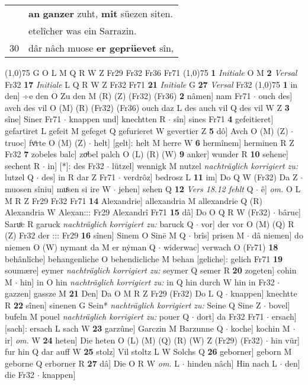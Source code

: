 \documentclass[8pt,a4paper,notitlepage]{article}
\begin{document}
\begin{table}[ht]
\begin{minipage}[t]{0.5\linewidth}
\begin{tabular}{rl}
 & \textbf{an} \textbf{ganzer} zuht, \textbf{mit} süezen siten.\\ 
 & etelîcher was ein Sarrazin.\\ 
30 & dâr nâch muose \textbf{er geprüevet} sîn,\\ 
\end{tabular}
\scriptsize
\line(1,0){75} \newline
G O L M Q R W Z Fr29 Fr32 Fr36 Fr71 \newline
\line(1,0){75} \newline
\textbf{1} \textit{Initiale} O M  \textbf{2} \textit{Versal} Fr32  \textbf{17} \textit{Initiale} L Q R W Z Fr32 Fr71  \textbf{21} \textit{Initiale} G  \textbf{27} \textit{Versal} Fr32  \newline
\line(1,0){75} \newline
\textbf{1} in den] ÷e den O Zu den M (R) (Z) (Fr32) (Fr36) \textbf{2} nâmen] nam Fr71  $\cdot$ ouch des] avch des vil O (M) (R) (Fr32) (Fr36) ouch daz L des auch vil Q des vil W Z \textbf{3} sîne] Siner Fr71  $\cdot$ knappen und] knechtten R  $\cdot$ sîn] sines Fr71 \textbf{4} gefeitieret] gefartiret L gefeit M gefeget Q gefurieret W gevertier Z \textbf{5} dô] Avch O (M) (Z)  $\cdot$ truoc] fvͦrte O (M) (Z)  $\cdot$ helt] [gelt]: helt M herre W \textbf{6} hermînem] herminen R Z Fr32 \textbf{7} zobeles balc] zoͮbel palch O (L) (R) (W) \textbf{9} anker] wunder R \textbf{10} sehene] sechent R  $\cdot$ in] [*]: des Fr32  $\cdot$ lützel] wennigk M nutzel \textit{nachträglich korrigiert zu:} lutzel Q  $\cdot$ des] in R dar Z Fr71  $\cdot$ verdrôz] bedrosz L \textbf{11} im] Do Q W (Fr32) Da Z  $\cdot$ muosen sîniu] muͤsen si ire W  $\cdot$ jehen] sehen Q \textbf{12} \textit{Vers 18.12 fehlt} Q   $\cdot$ ê] \textit{om.} O L M R Z Fr29 Fr32 Fr71 \textbf{14} Alexandrie] allexandria M allexandrie Q (R) Alexandria W Alexan::: Fr29 Alexandrî Fr71 \textbf{15} dâ] Do O Q R W (Fr32)  $\cdot$ bâruc] Saruͦc R garuck \textit{nachträglich korrigiert zu:} baruck Q  $\cdot$ vor] der vor O (M) (Q) R (Z) Fr32 der ::: Fr29 \textbf{16} sînen] Sinem O Sinē M Q  $\cdot$ brîs] prisen M  $\cdot$ dâ niemen] do niemen O (W) nymant da M er nẏman Q  $\cdot$ widerwac] verwach O (Fr71) \textbf{18} behânlîche] behangenliche O behendicliche M behan [geliche]: gelich Fr71 \textbf{19} soumære] eymer \textit{nachträglich korrigiert zu:} seymer Q semer R \textbf{20} zogeten] cohin M  $\cdot$ hin] in O hin \textit{nachträglich korrigiert zu:} in Q hin durch W hin in Fr32  $\cdot$ gazzen] gassze M \textbf{21} Den] Da O M R Z Fr29 (Fr32) Do L Q  $\cdot$ knappen] knechtte R \textbf{22} sînen] sinenen G Sein* \textit{nachträglich korrigiert zu:} Seine Q Sine Z  $\cdot$ bovel] bufeln M pouel \textit{nachträglich korrigiert zu:} pouer Q  $\cdot$ dort] da Fr32 Fr71  $\cdot$ ersach] [sach]: ersach L sach W \textbf{23} garzûne] Garczin M Barzunne Q  $\cdot$ koche] kochin M  $\cdot$ ir] \textit{om.} W \textbf{24} heten] Die heten O (L) (M) (Q) (R) (W) Z (Fr29) (Fr32)  $\cdot$ hin vür] fur hin Q dar auff W \textbf{25} stolz] Vil stoltz L W Solchs Q \textbf{26} geborner] geborn M geborne Q erborner R \textbf{27} dâ] Die O R W \textit{om.} L  $\cdot$ hinden nâch] Hin nach L  $\cdot$ den] die Fr32  $\cdot$ knappen] 
\end{minipage}
\end{table}
\end{document}
